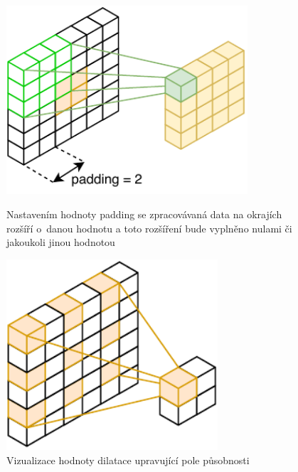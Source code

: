 \begin{figure}[H]
    \centering
    \begin{minipage}{0.45\textwidth}
        \centering
        \includegraphics[width=0.8\textwidth]{obrazky-figures/padding.pdf}
        \caption{\label{fig:conv_padding}Nastavením hodnoty padding se zpracovávaná data na okrajích rozšíří o~danou hodnotu a toto rozšíření bude vyplněno nulami či jakoukoli jinou hodnotou}
    \end{minipage}\hfill
    \begin{minipage}{0.45\textwidth}
        \centering
        \includegraphics[width=0.7\textwidth]{obrazky-figures/cnndilation.pdf}
        \caption{\label{fig:conv_dilation}Vizualizace hodnoty dilatace upravující pole působnosti}
    \end{minipage}
\end{figure}


